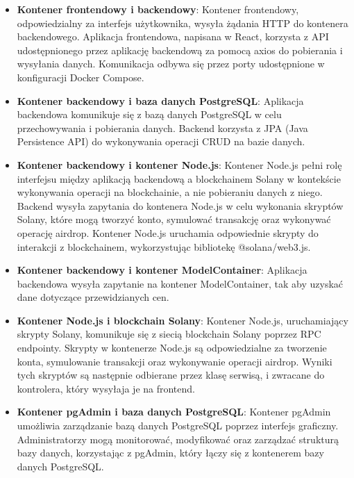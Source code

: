 \begin{itemize}
    \item \textbf{Kontener frontendowy i backendowy}: Kontener frontendowy, odpowiedzialny za interfejs użytkownika, wysyła żądania HTTP do kontenera backendowego. Aplikacja frontendowa, napisana w React, korzysta z API udostępnionego przez aplikację backendową za pomocą axios do pobierania i wysyłania danych. Komunikacja odbywa się przez porty udostępnione w konfiguracji Docker Compose.
    \item \textbf{Kontener backendowy i baza danych PostgreSQL}: Aplikacja backendowa komunikuje się z bazą danych PostgreSQL w celu przechowywania i pobierania danych. Backend korzysta z JPA (Java Persistence API) do wykonywania operacji CRUD na bazie danych.
    \item \textbf{Kontener backendowy i kontener Node.js}: Kontener Node.js pełni rolę interfejsu między aplikacją backendową a blockchainem Solany w kontekście wykonywania operacji na blockchainie, a nie pobieraniu danych z niego. Backend wysyła zapytania do kontenera Node.js w celu wykonania skryptów Solany, które mogą tworzyć konto, symulować transakcję oraz wykonywać operację airdrop. Kontener Node.js uruchamia odpowiednie skrypty do interakcji z blockchainem, wykorzystując bibliotekę @solana/web3.js.
		\item \textbf{Kontener backendowy i kontener ModelContainer}: Aplikacja backendowa wysyła zapytanie na kontener ModelContainer, tak aby uzyskać dane dotyczące przewidzianych cen. 
    \item \textbf{Kontener Node.js i blockchain Solany}: Kontener Node.js, uruchamiający skrypty Solany, komunikuje się z siecią blockchain Solany poprzez RPC endpointy. Skrypty w kontenerze Node.js są odpowiedzialne za tworzenie konta, symulowanie transakcji oraz wykonywanie operacji airdrop. Wyniki tych skryptów są następnie odbierane przez klasę serwisą, i zwracane do kontrolera, który wysyłaja je na frontend.
    \item \textbf{Kontener pgAdmin i baza danych PostgreSQL}: Kontener pgAdmin umożliwia zarządzanie bazą danych PostgreSQL poprzez interfejs graficzny. Administratorzy mogą monitorować, modyfikować oraz zarządzać strukturą bazy danych, korzystając z pgAdmin, który łączy się z kontenerem bazy danych PostgreSQL.
\end{itemize}

